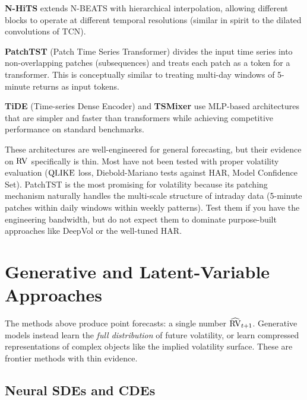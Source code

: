 \textbf{N-HiTS} extends N-BEATS with hierarchical interpolation, allowing different blocks to operate at different temporal resolutions (similar in spirit to the dilated convolutions of TCN).

\textbf{PatchTST} (Patch Time Series Transformer) divides the input time series into non-overlapping patches (subsequences) and treats each patch as a token for a transformer.
This is conceptually similar to treating multi-day windows of 5-minute returns as input tokens.

\textbf{TiDE} (Time-series Dense Encoder) and \textbf{TSMixer} use MLP-based architectures that are simpler and faster than transformers while achieving competitive performance on standard benchmarks.

\begin{keyidea}
These architectures are well-engineered for general forecasting, but their evidence on $\operatorname{RV}$ specifically is thin.
Most have not been tested with proper volatility evaluation ($\operatorname{QLIKE}$ loss, Diebold-Mariano tests against HAR, Model Confidence Set).
PatchTST is the most promising for volatility because its patching mechanism naturally handles the multi-scale structure of intraday data (5-minute patches within daily windows within weekly patterns).
Test them if you have the engineering bandwidth, but do not expect them to dominate purpose-built approaches like DeepVol or the well-tuned HAR.
\end{keyidea}


\section{Generative and Latent-Variable Approaches}\label{sec:dl:generative}

The methods above produce point forecasts: a single number $\widehat{\operatorname{RV}}_{t+1}$.
Generative models instead learn the \emph{full distribution} of future volatility, or learn compressed representations of complex objects like the implied volatility surface.
These are frontier methods with thin evidence.

\subsection{Neural SDEs and CDEs}

